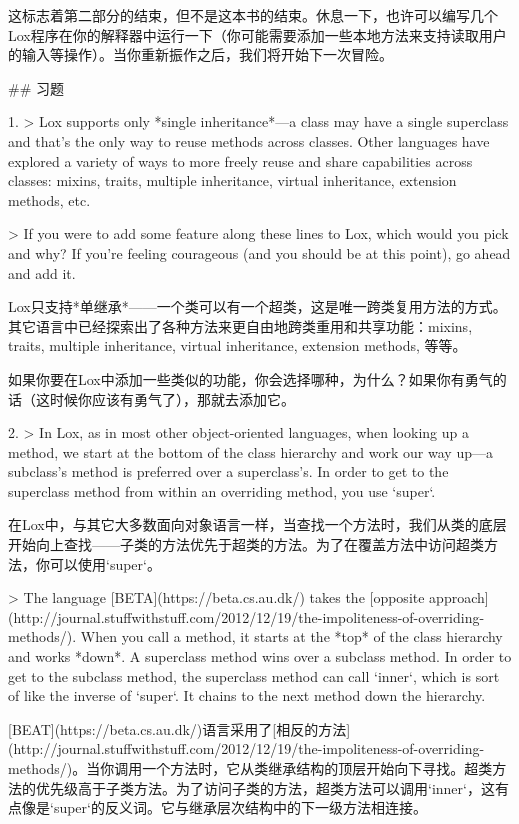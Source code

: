 \documentclass[cn,11pt,chinese]{elegantbook}
\begin{document}
这标志着第二部分的结束，但不是这本书的结束。休息一下，也许可以编写几个Lox程序在你的解释器中运行一下（你可能需要添加一些本地方法来支持读取用户的输入等操作）。当你重新振作之后，我们将开始下一次冒险。

## 习题

1. > Lox supports only *single inheritance*—a class may have a single superclass and that’s the only way to reuse methods across classes. Other languages have explored a variety of ways to more freely reuse and share capabilities across classes: mixins, traits, multiple inheritance, virtual inheritance, extension methods, etc.

   > If you were to add some feature along these lines to Lox, which would you pick and why? If you’re feeling courageous (and you should be at this point), go ahead and add it.

   Lox只支持*单继承*——一个类可以有一个超类，这是唯一跨类复用方法的方式。其它语言中已经探索出了各种方法来更自由地跨类重用和共享功能：mixins, traits, multiple inheritance, virtual inheritance, extension methods, 等等。

   如果你要在Lox中添加一些类似的功能，你会选择哪种，为什么？如果你有勇气的话（这时候你应该有勇气了），那就去添加它。

2. > In Lox, as in most other object-oriented languages, when looking up a method, we start at the bottom of the class hierarchy and work our way up—a subclass’s method is preferred over a superclass’s. In order to get to the superclass method from within an overriding method, you use `super`.

   在Lox中，与其它大多数面向对象语言一样，当查找一个方法时，我们从类的底层开始向上查找——子类的方法优先于超类的方法。为了在覆盖方法中访问超类方法，你可以使用`super`。

   > The language [BETA](https://beta.cs.au.dk/) takes the [opposite approach](http://journal.stuffwithstuff.com/2012/12/19/the-impoliteness-of-overriding-methods/). When you call a method, it starts at the *top* of the class hierarchy and works *down*. A superclass method wins over a subclass method. In order to get to the subclass method, the superclass method can call `inner`, which is sort of like the inverse of `super`. It chains to the next method down the hierarchy.

   [BEAT](https://beta.cs.au.dk/)语言采用了[相反的方法](http://journal.stuffwithstuff.com/2012/12/19/the-impoliteness-of-overriding-methods/)。当你调用一个方法时，它从类继承结构的顶层开始向下寻找。超类方法的优先级高于子类方法。为了访问子类的方法，超类方法可以调用`inner`，这有点像是`super`的反义词。它与继承层次结构中的下一级方法相连接。
\end{document}

